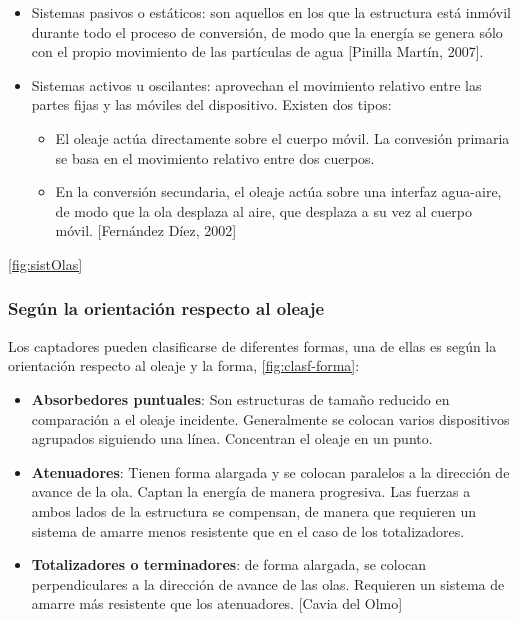 \begin{itemize}
\item
  Sistemas pasivos o estáticos: son aquellos en los que la estructura
  está inmóvil durante todo el proceso de conversión, de modo que la
  energía se genera sólo con el propio movimiento de las partículas de
  agua {[}Pinilla Martín, 2007{]}.
\item
  Sistemas activos u oscilantes: aprovechan el movimiento relativo entre
  las partes fijas y las móviles del dispositivo. Existen dos tipos:

  \begin{itemize}
  \item
    El oleaje actúa directamente sobre el cuerpo móvil. La convesión
    primaria se basa en el movimiento relativo entre dos cuerpos.
  \item
    En la conversión secundaria, el oleaje actúa sobre una interfaz
    agua-aire, de modo que la ola desplaza al aire, que desplaza a su
    vez al cuerpo móvil. {[}Fernández Díez, 2002{]}
  \end{itemize}
\end{itemize}

\autoref{fig:sistOlas}

\subsubsection{Según la orientación respecto al
oleaje}\label{header-n106}

Los captadores pueden clasificarse de diferentes formas, una de ellas es
según la orientación respecto al oleaje y la forma, \autoref{fig:clasf-forma}:

\begin{itemize}
\item
  \textbf{Absorbedores puntuales}: Son estructuras de tamaño reducido en
  comparación a el oleaje incidente. Generalmente se colocan varios
  dispositivos agrupados siguiendo una línea. Concentran el oleaje en un
  punto.
\item
  \textbf{Atenuadores}: Tienen forma alargada y se colocan paralelos a
  la dirección de avance de la ola. Captan la energía de manera
  progresiva. Las fuerzas a ambos lados de la estructura se compensan,
  de manera que requieren un sistema de amarre menos resistente que en
  el caso de los totalizadores.
\item
  \textbf{Totalizadores o terminadores}: de forma alargada, se colocan
  perpendiculares a la dirección de avance de las olas. Requieren un
  sistema de amarre más resistente que los atenuadores. {[}Cavia del
  Olmo{]}
\end{itemize}

